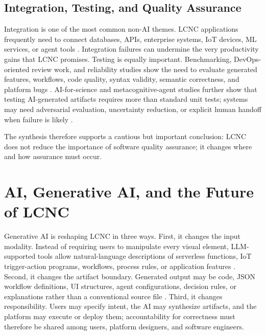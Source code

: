\documentclass[conference]{IEEEtran}
\begin{document}
\subsection{Integration, Testing, and Quality Assurance}
Integration is one of the most common non-AI themes. LCNC applications frequently need to connect databases, APIs, enterprise systems, IoT devices, ML services, or agent tools \cite{p17,p20,p30,p32,p40,p48}. Integration failures can undermine the very productivity gains that LCNC promises. Testing is equally important. Benchmarking, DevOps-oriented review work, and reliability studies show the need to evaluate generated features, workflows, code quality, syntax validity, semantic correctness, and platform bugs \cite{p04,p08,p21,p25,p26}. AI-for-science and metacognitive-agent studies further show that testing AI-generated artifacts requires more than standard unit tests; systems may need adversarial evaluation, uncertainty reduction, or explicit human handoff when failure is likely \cite{p01,p42}.

The synthesis therefore supports a cautious but important conclusion: LCNC does not reduce the importance of software quality assurance; it changes where and how assurance must occur.

\section{AI, Generative AI, and the Future of LCNC}
Generative AI is reshaping LCNC in three ways. First, it changes the input modality. Instead of requiring users to manipulate every visual element, LLM-supported tools allow natural-language descriptions of serverless functions, IoT trigger-action programs, workflows, process rules, or application features \cite{p04,p05,p07,p08,p35}. Second, it changes the artifact boundary. Generated output may be code, JSON workflow definitions, UI structures, agent configurations, decision rules, or explanations rather than a conventional source file \cite{p06,p31,p32,p39,p40}. Third, it changes responsibility. Users may specify intent, the AI may synthesize artifacts, and the platform may execute or deploy them; accountability for correctness must therefore be shared among users, platform designers, and software engineers.
\end{document}
